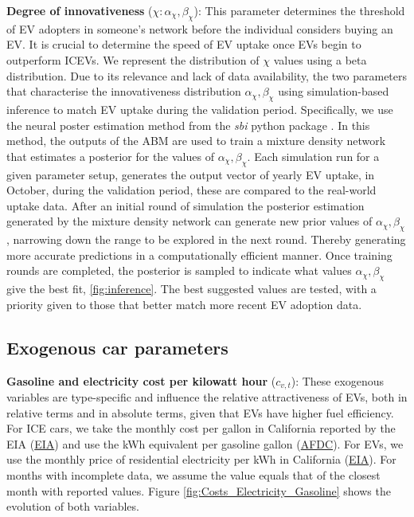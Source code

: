 \documentclass[12pt]{article}
\begin{document}
	\textbf{Degree of innovativeness} ($\chi: \alpha_{\chi},\beta_{\chi}$): This parameter determines the threshold of EV adopters in someone's network before the individual considers buying an EV. It is crucial to determine the speed of EV uptake once EVs begin to outperform ICEVs. We represent the distribution of $\chi$ values using a beta distribution. Due to its relevance and lack of data availability, the two parameters that characterise the innovativeness distribution $\alpha_{\chi},\beta_{\chi} $ using simulation-based inference \citep{papamakarios2016fast,cranmer2020frontier, dyer2024black} to match EV uptake during the validation period. Specifically, we use the neural poster estimation method from the \textit{sbi} python package \citep{tejero-cantero2020sbi}. In this method, the outputs of the ABM are used to train a mixture density network that estimates a posterior for the values of $\alpha_{\chi},\beta_{\chi}$. Each simulation run for a given parameter setup, generates the output vector of yearly EV uptake, in October, during the validation period, these are compared to the real-world uptake data. After an initial round of simulation the posterior estimation generated by the mixture density network can generate new prior values of $\alpha_{\chi},\beta_{\chi}$, narrowing down the range to be explored in the next round. Thereby generating more accurate predictions in a computationally efficient manner. Once training rounds are completed, the posterior is sampled to indicate what values $\alpha_{\chi},\beta_{\chi}$ give the best fit, \ref{fig:inference}. The best suggested values are tested, with a priority given to those that better match more recent EV adoption data.
	
	\subsection{Exogenous car parameters} \label{Callibration_CarParams}
	
	\textbf{Gasoline and electricity cost per kilowatt hour} ($c_{v,t}$): These exogenous variables are type-specific and influence the relative attractiveness of EVs, both in relative terms and in absolute terms, given that EVs have higher fuel efficiency. For ICE cars, we take the monthly cost per gallon in California reported by the EIA (\href{https://www.eia.gov/petroleum/gasdiesel/}{EIA}) and use the kWh equivalent per gasoline gallon (\href{https://afdc.energy.gov/fuels/properties}{AFDC}). For EVs, we use the monthly price of residential electricity per kWh in California (\href{https://www.eia.gov/opendata/browser/electricity/retail-sales}{EIA}). For months with incomplete data, we assume the value equals that of the closest month with reported values. Figure \ref{fig:Costs_Electricity_Gasoline} shows the evolution of both variables.
	
\end{document}

